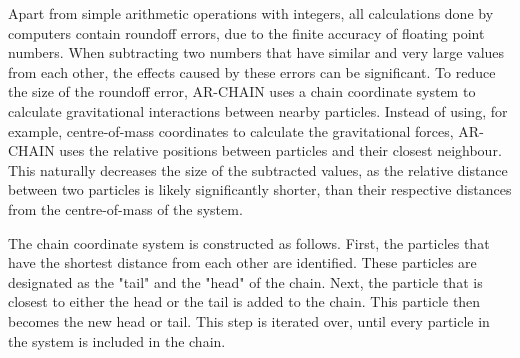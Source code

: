 \documentclass[english, twoside]{HYgradu}
\begin{document}
Apart from simple arithmetic operations with integers, all calculations done by computers contain roundoff errors, due to the finite accuracy of floating point numbers. When subtracting two numbers that have similar and very large values from each other, the effects caused by these errors can be significant. To reduce the size of the roundoff error, AR-CHAIN uses a chain coordinate system to calculate gravitational interactions between nearby particles. Instead of using, for example, centre-of-mass coordinates to calculate the gravitational forces, AR-CHAIN uses the relative positions between particles and their closest neighbour. This naturally decreases the size of the subtracted values, as the relative distance between two particles is likely significantly shorter, than their respective distances from the centre-of-mass of the system.

The chain coordinate system is constructed as follows. First, the particles that have the shortest distance from each other are identified. These particles are designated as the "tail" and the "head" of the chain. Next, the particle that is closest to either the head or the tail is added to the chain. This particle then becomes the new head or tail. This step is iterated over, until every particle in the system is included in the chain.
\end{document}
